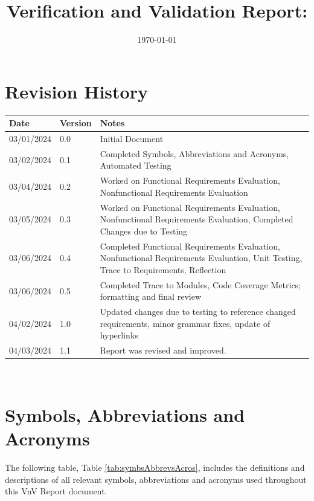 \documentclass[12pt, titlepage]{article}
\begin{document}
\title{Verification and Validation Report: \progname} 
\author{\authname}
\date{\today}
  
\maketitle


\section{Revision History}

\begin{tabularx}{\textwidth}{p{3cm}p{2cm}X}
\toprule {\bf Date} & {\bf Version} & {\bf Notes}\\
\midrule
03/01/2024 & 0.0 & Initial Document \\
03/02/2024 & 0.1 & Completed Symbols, Abbreviations and Acronyms, Automated Testing \\
03/04/2024 & 0.2 & Worked on Functional Requirements Evaluation, Nonfunctional Requirements Evaluation \\
03/05/2024 & 0.3 & Worked on Functional Requirements Evaluation, Nonfunctional Requirements Evaluation, Completed Changes due to Testing \\
03/06/2024 & 0.4 & Completed Functional Requirements Evaluation, Nonfunctional Requirements Evaluation, Unit Testing, Trace to Requirements, Reflection \\
03/06/2024 & 0.5 & Completed Trace to Modules, Code Coverage Metrics; formatting and final review \\
04/02/2024 & 1.0 & Updated changes due to testing to reference changed requirements, minor grammar fixes, update of hyperlinks\\ 
04/03/2024 & 1.1 & Report was revised and improved. \\
\bottomrule
\end{tabularx}

~\newpage

\section{Symbols, Abbreviations and Acronyms}
The following table, Table \ref{tab:symbsAbbrevsAcros}, includes the definitions and descriptions of all relevant symbols, abbreviations and acronyms used throughout this VnV Report document.
\end{document}
